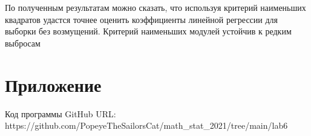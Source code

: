 \documentclass{article}
\begin{document}
\noindent По полученным результатам можно сказать, что используя критерий наименьших квадратов удастся точнее оценить коэффициенты линейной регрессии для выборки без возмущений. Критерий наименьших модулей устойчив к редким выбросам

\section{Приложение}
\noindent Код программы GitHub URL:\\https://github.com/PopeyeTheSailorsCat/math\_stat\_2021/tree/main/lab6
\newline 
\end{document}
